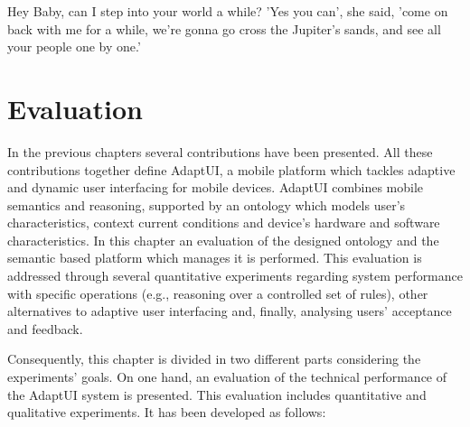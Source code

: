 \begin{savequote}[50mm]
Hey Baby, can I step into your world a while? 'Yes you can', she said, 
'come on back with me for a while, we're gonna go cross the Jupiter's sands,
and see all your people one by one.'
\end{savequote}

\ifpdf
\graphicspath{{5_experiments_and_results/figures/PNG/}
{5_experiments_and_results/figures/PDF/}{5_experiments_and_results/figures/}}
\fi

\chapter{Evaluation}
\label{cha:evaluation}


In the previous chapters several contributions have been presented. All these
contributions together define AdaptUI, a mobile platform which tackles adaptive 
and dynamic user interfacing for mobile devices. AdaptUI combines mobile 
semantics and reasoning, supported by an ontology which models user's 
characteristics, context current conditions and device's hardware and software 
characteristics. In this chapter an evaluation of the designed ontology and the 
semantic based platform which manages it is performed. This evaluation is 
addressed through several quantitative experiments regarding system performance 
with specific operations (e.g., reasoning over a controlled set of rules), other 
alternatives to adaptive user interfacing and, finally, analysing users' 
acceptance and feedback.

Consequently, this chapter is divided in two different parts considering the 
experiments' goals. On one hand, an evaluation of the technical performance
of the AdaptUI system is presented. This evaluation includes quantitative and 
qualitative experiments. It has been developed as follows:

